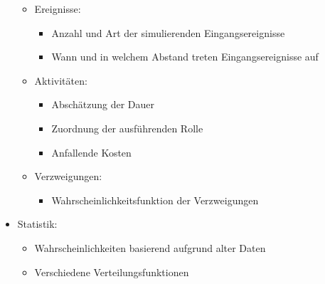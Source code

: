 \documentclass[11pt,a4paper]{article}
\begin{document}
\begin{itemize}
\begin{itemize}
\begin{itemize}
		\end{itemize}
	\item Ereignisse:
		\begin{itemize}
		\item Anzahl und Art der simulierenden Eingangsereignisse
		\item Wann und in welchem Abstand treten Eingangsereignisse auf
		\end{itemize}
	\item Aktivitäten:
		\begin{itemize}
		\item Abschätzung der Dauer
		\item Zuordnung der ausführenden Rolle
		\item Anfallende Kosten
		\end{itemize}
	\item Verzweigungen:
		\begin{itemize}
		\item Wahrscheinlichkeitsfunktion der Verzweigungen
		\end{itemize}
	\end{itemize}
	
\item Statistik:
	\begin{itemize}
	\item Wahrscheinlichkeiten basierend aufgrund alter Daten
	\item Verschiedene Verteilungsfunktionen
	\end{itemize}

\end{itemize}
\end{document}
